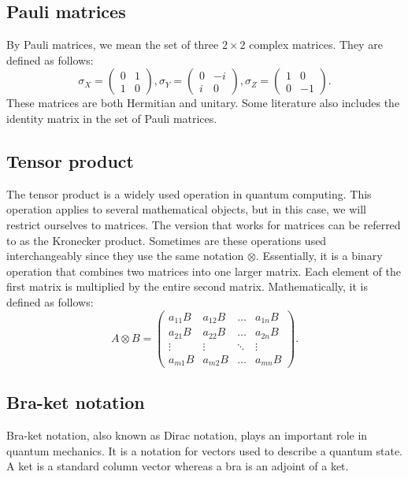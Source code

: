 \tocless\subsection{Pauli matrices}\label{sec:pauli-matrices}\noindent
By Pauli matrices, we mean the set of three $2 \times 2$ complex matrices. They are defined as follows:
\begin{equation}
  \sigma_X = \begin{pmatrix}
    0 & 1 \\
    1 & 0
 \end{pmatrix}, \sigma_Y = \begin{pmatrix}
    0 & -i \\
    i & 0
\end{pmatrix}, \sigma_Z = \begin{pmatrix}
    1 & 0 \\
    0 & -1
\end{pmatrix}\text{.}
\end{equation}
These matrices are both Hermitian and unitary. Some literature also includes the identity matrix in the set of Pauli matrices. 

\tocless\subsection{Tensor product}\noindent
The tensor product is a widely used operation in quantum computing. This operation applies to several mathematical objects, but in this case, we will restrict ourselves to matrices. The version that works for matrices can be referred to as the Kronecker product. Sometimes are these operations used interchangeably since they use the same notation $\otimes$. Essentially, it is a binary operation that combines two matrices into one larger matrix. Each element of the first matrix is multiplied by the entire second matrix. Mathematically, it is defined as follows:
\begin{equation}
  A \otimes B = \begin{pmatrix}
    a_{11}B & a_{12}B & \hdots & a_{1n}B \\
    a_{21}B & a_{22}B & \hdots & a_{2n}B \\
    \vdots & \vdots & \ddots & \vdots \\
    a_{m1}B & a_{m2}B & \hdots & a_{mn}B
  \end{pmatrix}\text{.}
\end{equation}

\tocless\subsection{Bra-ket notation}\noindent
Bra-ket notation, also known as Dirac notation, plays an important role in quantum mechanics. It is a notation for vectors used to describe a quantum state. A ket is a standard column vector whereas a bra is an adjoint of a ket. 


